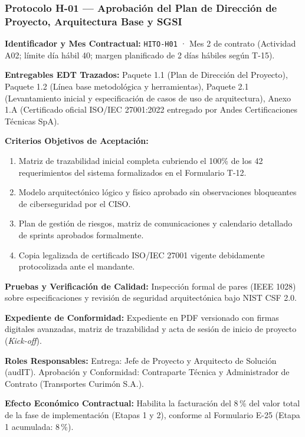 \subsubsection*{Protocolo H-01 — Aprobación del Plan de Dirección de Proyecto, Arquitectura Base y SGSI}\label{sec:9-proto-h1}
\par\noindent\textbf{Identificador y Mes Contractual:} \texttt{HITO-H01} · Mes 2 de contrato (Actividad A02; límite día hábil 40; margen planificado de 2 días hábiles según T-15).\par
\par\noindent\textbf{Entregables EDT Trazados:} Paquete 1.1 (Plan de Dirección del Proyecto), Paquete 1.2 (Línea base metodológica y herramientas), Paquete 2.1 (Levantamiento inicial y especificación de casos de uso de arquitectura), Anexo 1.A (Certificado oficial ISO/IEC 27001:2022 entregado por Andes Certificaciones Técnicas SpA).\par
\par\noindent\textbf{Criterios Objetivos de Aceptación:}
\begin{enumerate}
  \item Matriz de trazabilidad inicial completa cubriendo el 100\% de los 42 requerimientos del sistema formalizados en el Formulario T-12.
  \item Modelo arquitectónico lógico y físico aprobado sin observaciones bloqueantes de ciberseguridad por el CISO.
  \item Plan de gestión de riesgos, matriz de comunicaciones y calendario detallado de sprints aprobados formalmente.
  \item Copia legalizada de certificado ISO/IEC 27001 vigente debidamente protocolizada ante el mandante.
\end{enumerate}
\par\noindent\textbf{Pruebas y Verificación de Calidad:} Inspección formal de pares (IEEE 1028) sobre especificaciones y revisión de seguridad arquitectónica bajo NIST CSF 2.0.\par
\par\noindent\textbf{Expediente de Conformidad:} Expediente en PDF versionado con firmas digitales avanzadas, matriz de trazabilidad y acta de sesión de inicio de proyecto (\textit{Kick-off}).\par
\par\noindent\textbf{Roles Responsables:} Entrega: Jefe de Proyecto y Arquitecto de Solución (audIT). Aprobación y Conformidad: Contraparte Técnica y Administrador de Contrato (Transportes Curimón S.A.).\par
\par\noindent\textbf{Efecto Económico Contractual:} Habilita la facturación del 8\,\% del valor total de la fase de implementación (Etapas 1 y 2), conforme al Formulario E-25 (Etapa 1 acumulada: 8\,\%).\par

